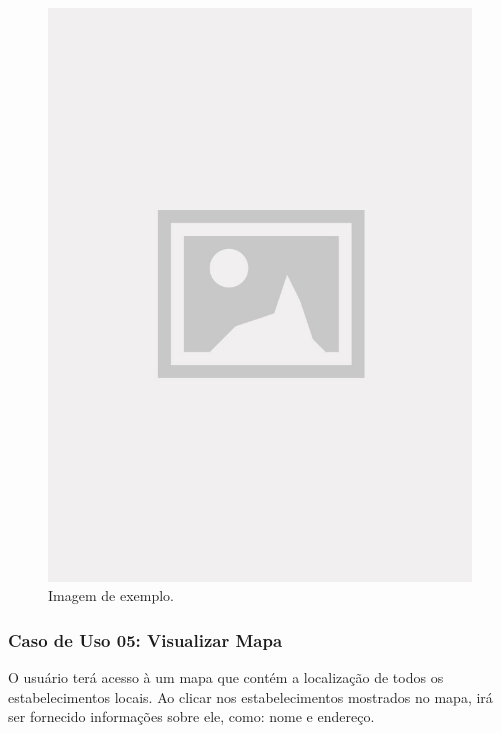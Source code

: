 \begin{figure}[!htb]
\centering
\caption{Imagem de exemplo.}
\includegraphics[width=\linewidth]{figuras/placeholder.jpg}
\end{figure}

\subsubsection{Caso de Uso 05: Visualizar Mapa}

O usuário terá acesso à um mapa que contém a localização de todos os estabelecimentos locais. Ao clicar nos estabelecimentos mostrados no mapa, irá ser fornecido informações sobre ele, como: nome e endereço.

